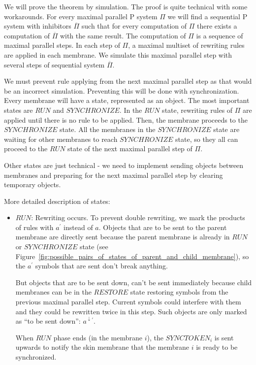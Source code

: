 \begin{dokaz}
  We will prove the theorem by simulation.
  The proof is quite technical with some workarounds.
  For every maximal parallel P system $\Pi$ we will find a sequential P system with inhibitors $\overline{\Pi}$ such that for every computation of $\Pi$ there exists a computation of $\overline{\Pi}$ with the same result.
  The computation of $\Pi$ is a sequence of maximal parallel steps.
  In each step of $\Pi$, a maximal multiset of rewriting rules are applied in each membrane.
  We simulate this maximal parallel step with several steps of sequential system $\overline{\Pi}$.

  We must prevent rule applying from the next maximal parallel step as that would be an incorrect simulation.
  Preventing this will be done with synchronization.
  Every membrane will have a state, represented as an object.
  The most important states are $RUN$ and $SYNCHRONIZE$.
  In the $RUN$ state, rewriting rules of $\Pi$ are applied until there is no rule to be applied. Then, the membrane proceeds to the $SYNCHRONIZE$ state.
  All the membranes in the $SYNCHRONIZE$ state are waiting for other membranes to reach $SYNCHRONIZE$ state, so they all can proceed to the $RUN$ state of the next maximal parallel step of $\Pi$.

  Other states are just technical - we need to implement sending objects between membranes and preparing for the next maximal parallel step by clearing temporary objects.

  More detailed description of states:
  

  \begin{itemize}
    \item $RUN$: Rewriting occurs.
    To prevent double rewriting, we mark the products of rules with $a^{\prime}$ instead of $a$.
    Objects that are to be sent to the parent membrane are directly sent because the parent membrane is already in $RUN$ or $SYNCHRONIZE$ state (see Figure~\ref{fig:possible_pairs_of_states_of_parent_and_child_membrane}), so the $a^{\prime}$ symbols that are sent don't break anything.
    
    But objects that are to be sent down, can't be sent immediately because child membranes can be in the $RESTORE$ state restoring symbols from the previous maximal parallel step. Current symbols could interfere with them and they could be rewritten twice in this step. Such objects are only marked as ``to be sent down'': $a^{\downarrow\prime}$.

    When $RUN$ phase ends (in the membrane $i$), the $SYNCTOKEN_i$ is sent upwards to notify the skin membrane that the membrane $i$ is ready to be synchronized.


\end{itemize}
\end{dokaz}
